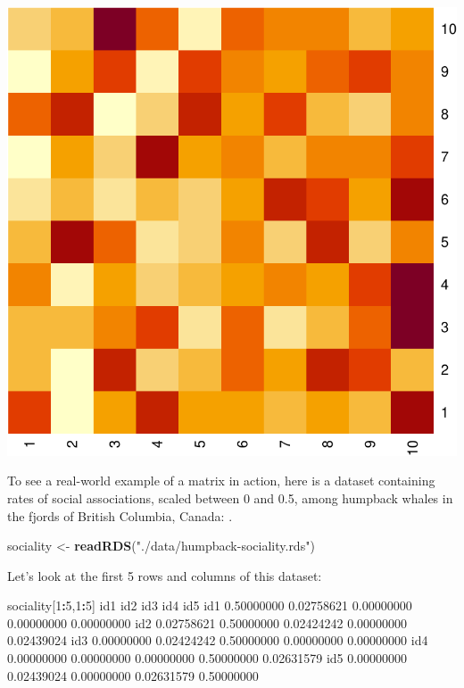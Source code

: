 \documentclass[]{book}
\newenvironment{Shaded}{\begin{snugshade}}{\end{snugshade}}
\newcommand{\DecValTok}[1]{\textcolor[rgb]{0.00,0.00,0.81}{#1}}
\newcommand{\FloatTok}[1]{\textcolor[rgb]{0.00,0.00,0.81}{#1}}
\newcommand{\KeywordTok}[1]{\textcolor[rgb]{0.13,0.29,0.53}{\textbf{#1}}}
\newcommand{\NormalTok}[1]{#1}
\newcommand{\OperatorTok}[1]{\textcolor[rgb]{0.81,0.36,0.00}{\textbf{#1}}}
\newcommand{\StringTok}[1]{\textcolor[rgb]{0.31,0.60,0.02}{#1}}
\begin{document}
\includegraphics{figures/unnamed-chunk-605-1.pdf}

To see a real-world example of a matrix in action, here is a dataset containing rates of social associations, scaled between 0 and 0.5, among humpback whales in the fjords of British Columbia, Canada: .

\begin{Shaded}
\begin{Highlighting}[]
\NormalTok{sociality <-}\StringTok{ }\KeywordTok{readRDS}\NormalTok{(}\StringTok{"./data/humpback-sociality.rds"}\NormalTok{)}
\end{Highlighting}
\end{Shaded}

Let's look at the first 5 rows and columns of this dataset:

\begin{Shaded}
\begin{Highlighting}[]
\NormalTok{sociality[}\DecValTok{1}\OperatorTok{:}\DecValTok{5}\NormalTok{,}\DecValTok{1}\OperatorTok{:}\DecValTok{5}\NormalTok{]}
\NormalTok{           id1        id2        id3        id4        id5}
\NormalTok{id1 }\FloatTok{0.50000000} \FloatTok{0.02758621} \FloatTok{0.00000000} \FloatTok{0.00000000} \FloatTok{0.00000000}
\NormalTok{id2 }\FloatTok{0.02758621} \FloatTok{0.50000000} \FloatTok{0.02424242} \FloatTok{0.00000000} \FloatTok{0.02439024}
\NormalTok{id3 }\FloatTok{0.00000000} \FloatTok{0.02424242} \FloatTok{0.50000000} \FloatTok{0.00000000} \FloatTok{0.00000000}
\NormalTok{id4 }\FloatTok{0.00000000} \FloatTok{0.00000000} \FloatTok{0.00000000} \FloatTok{0.50000000} \FloatTok{0.02631579}
\NormalTok{id5 }\FloatTok{0.00000000} \FloatTok{0.02439024} \FloatTok{0.00000000} \FloatTok{0.02631579} \FloatTok{0.50000000}
\end{Highlighting}
\end{Shaded}
\end{document}
